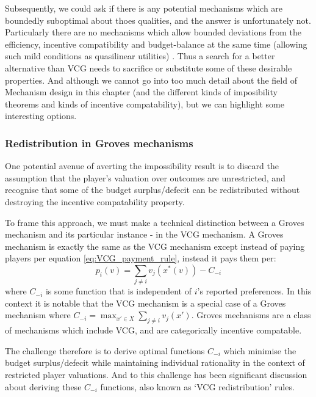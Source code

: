 Subsequently, we could ask if there is any potential mechanisms which are boundedly suboptimal about thoes qualities, and the answer is unfortunately not.
Particularly there are no mechanisms which allow bounded deviations from the efficiency, incentive compatibility and budget-balance at the same time (allowing such mild conditions as quasilinear utilities) \cite{YI201679}.
Thus a search for a better alternative than VCG needs to sacrifice or substitute some of these desirable properties.
And although we cannot go into too much detail about the field of Mechanism design in this chapter (and the different kinds of imposibility theorems and kinds of incentive compatability), but we can highlight some interesting options.

\subsubsection*{Redistribution in Groves mechanisms}

One potential avenue of averting the impossibility result is to discard the assumption that the player's valuation over outcomes are unrestricted, and recognise that some of the budget surplus/defecit can be redistributed without destroying the incentive compatability property.

To frame this approach, we must make a technical distinction between a Groves mechanism and its particular instance - in the VCG mechanism.
A Groves mechanism is exactly the same as the VCG mechanism except instead of paying players per equation \ref{eq:VCG_payment_rule}, instead it pays them per:
\begin{equation}\label{eq:Groves_payment_equation} p_i(v)=\sum_{j\ne i}v_j(x^*(v)) - C_{-i} \end{equation}
where $C_{-i}$ is some function that is independent of $i$'s reported preferences.
In this context it is notable that the VCG mechanism is a special case of a Groves mechanism where $C_{-i}= \max_{x'\in X}\sum_{j\ne i}v_j(x')$. \cite{10.2307/1914085}
Groves mechanisms are a class of mechanisms which include VCG, and are categorically incentive compatable. 

The challenge therefore is to derive optimal functions $C_{-i}$ which minimise the budget surplus/defecit while maintaining individual rationality in the context of restricted player valuations.
And to this challenge has been significant discussion about deriving these $C_{-i}$ functions, also known as `VCG redistribution' rules.

